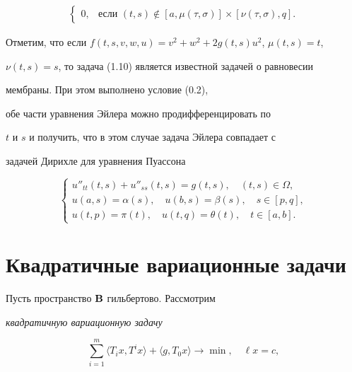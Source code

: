 \begin{exam}
\begin{align*}
\begin{cases}
0,&\text{если }(t,s)\notin[a,\mu(\tau,\sigma)]\times[\nu(\tau,\sigma),q].


\end{cases}


\end{align*}





Отметим, что если $f(t,s,v,w,u)=v^2+w^2+2g(t,s)u^2$, $\mu(t,s)=t$,


$\nu(t,s)=s$, то задача (1.10) является известной задачей о равновесии


мембраны. При этом выполнено условие (0.2),


обе части уравнения Эйлера можно продифференцировать по


$t$ и $s$ и получить, что в этом случае задача Эйлера совпадает с


задачей Дирихле для уравнения Пуассона


$$


\begin{cases}


u''_{tt}(t,s)+u''_{ss}(t,s)=g(t,s),\quad(t,s)\in\Omega,\\


u(a,s)=\alpha(s),\quad u(b,s)=\beta(s),\quad s\in[p,q],\\


u(t,p)=\pi(t),\quad u(t,q)=\theta(t),\quad t\in[a,b].


\end{cases}


$$


\end{exam}





\section{Квадратичные вариационные задачи}





Пусть пространство $\bold B{}$ гильбертово. Рассмотрим


{\it квадратичную вариационную задачу}


\begin{equation}


\sum_{i=1}^m\langle T_ix,T^ix\rangle+\langle g,T_0x\rangle


\longrightarrow\min,\quad


\ell x=c,


\end{equation}


